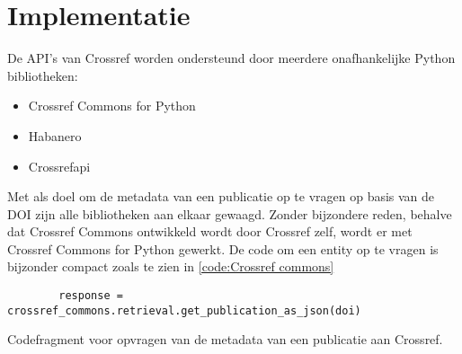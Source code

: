 \section{Implementatie}
De API's van Crossref worden ondersteund door meerdere onafhankelijke Python bibliotheken:
\begin{itemize}
    \item Crossref Commons for Python \autocite{Crossrefcommons2025}
    \item Habanero \autocite{Habanero2025}
    \item Crossrefapi \autocite{Crossrefapi2025}
\end{itemize}
Met als doel om de metadata van een publicatie op te vragen op basis van de DOI zijn alle bibliotheken aan elkaar gewaagd. Zonder bijzondere reden, behalve dat Crossref Commons ontwikkeld wordt door Crossref zelf, wordt er met Crossref Commons for Python gewerkt. De code om een entity op te vragen is bijzonder compact zoals te zien in \ref{code:Crossref commons}
\begin{listing}
    \begin{verbatim}
        response = crossref_commons.retrieval.get_publication_as_json(doi)
    \end{verbatim}
    \caption[Crossref commons codefragment]{Codefragment voor opvragen van de metadata van een publicatie aan Crossref.}
    \label{code:Crossref commons}
\end{listing}
